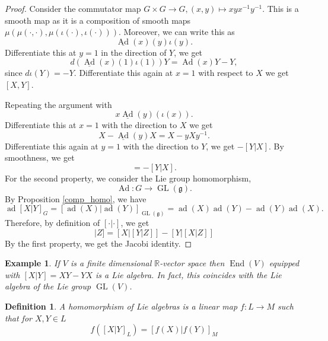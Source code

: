 \documentclass{article}
\newtheorem{definition}{Definition}[section]
\newtheorem{example}{Example}[section]
\numberwithin{equation}{section}
\DeclareMathOperator{\Ad}{Ad}
\DeclareMathOperator{\ad}{ad}
\DeclareMathOperator{\End}{End}
\DeclareMathOperator{\GL}{GL}
\begin{document}
\begin{proof}
Consider the commutator map $G\times G\to G,(x,y)\mapsto xyx^{-1}y^{-1}$. This is a smooth map as it is a composition of smooth maps $\mu(\mu(\cdot,\cdot),\mu(\iota(\cdot),\iota(\cdot)))$. Moreover, we can write this as
\begin{equation*}
\underline{\Ad}(x)(y)\iota(y).
\end{equation*}
Differentiate this at $y=1$ in the direction of $Y$, we get 
\begin{equation*}
d(\underline{\Ad}(x)(1)\iota(1))Y = \Ad(x)Y-Y,
\end{equation*}
since $d\iota(Y) = -Y$. Differentiate this again at $x=1$ with respect to $X$ we get $[X,Y]$.\\
\par Repeating the argument with 
\begin{equation*}
x\underline{\Ad}(y)(\iota(x)).
\end{equation*}
Differentiate this at $x=1$ with the direction to $X$ we get
\begin{equation*}
X-\underline{\Ad}(y)X=X-yXy^{-1}.
\end{equation*}
Differentiate this again at $y=1$ with the direction to $Y$, we get $-[Y|X]$. By smoothness, we get
\begin{equation*}
[X|Y]=-[Y|X].
\end{equation*}
For the second property, we consider the Lie group homomorphism,
\begin{equation*}
\Ad:G\to\GL(\mathfrak{g}).
\end{equation*}
By Proposition \ref{comp_homo}, we have
\begin{equation*}
\ad[X|Y]_G=[\ad(X)|\ad(Y)]_{\GL(\mathfrak{g})} = \ad(X)\ad(Y)-\ad(Y)\ad(X).
\end{equation*}
Therefore, by definition of $[\cdot|\cdot]$, we get
\begin{equation*}
[[X|Y]|Z]=[X|[Y|Z]]-[Y|[X|Z]]
\end{equation*}
By the first property, we get the Jacobi identity.
\end{proof}

\begin{example}
If $V$ is a finite dimensional $\mathbb{R}$-vector space then $\End(V)$ equipped with $[X|Y]=XY-YX$ is a Lie algebra. In fact, this coincides with the Lie algebra of the Lie group $\GL(V)$.
\end{example}

\begin{definition}
A homomorphism of Lie algebras is a linear map $f:L\to M$ such that for $X,Y\in L$ 
\begin{equation*}
f([X|Y]_L) = [f(X)|f(Y)]_M
\end{equation*}
\end{definition}
\end{document}

